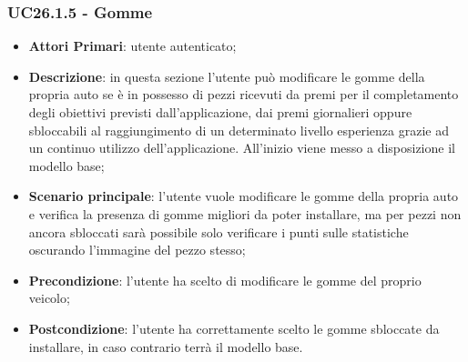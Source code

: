 \subsubsection{UC26.1.5 - Gomme}
\begin{itemize}
	\item \textbf{Attori Primari}: utente autenticato;
	\item \textbf{Descrizione}: in questa sezione l'utente può modificare le gomme della propria auto se è in possesso di pezzi ricevuti da premi per il completamento degli obiettivi previsti dall'applicazione, dai premi giornalieri oppure sbloccabili al raggiungimento di un determinato livello esperienza grazie ad un continuo utilizzo dell'applicazione.
	All'inizio viene messo a disposizione il modello base;
	\item \textbf{Scenario principale}: l'utente vuole modificare le gomme della propria auto e verifica la presenza di gomme migliori da poter installare, ma per pezzi non ancora sbloccati sarà possibile solo verificare i punti sulle statistiche oscurando l'immagine del pezzo stesso;
	\item \textbf{Precondizione}: l'utente ha scelto di modificare le gomme del proprio veicolo; 
	\item \textbf{Postcondizione}: l'utente ha correttamente scelto le gomme sbloccate da installare, in caso contrario terrà il modello base.
\end{itemize}
